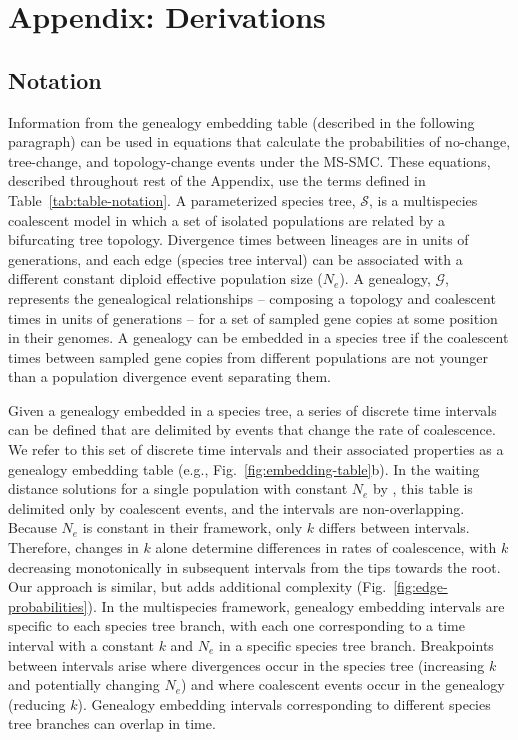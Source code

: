 \documentclass[11pt]{article}
\begin{document}
\section{Appendix: Derivations}

\subsection{Notation}

Information from the genealogy embedding table (described in the following paragraph) can be used 
in equations that 
calculate the 
probabilities of no-change, tree-change, and topology-change events under the 
MS-SMC. These equations, described throughout rest of the Appendix, use the terms defined in 
Table~\ref{tab:table-notation}. 
A parameterized species tree, $\mathcal{S}$, is a multispecies coalescent 
model in which a set of isolated populations are related by a bifurcating
tree topology. Divergence times between lineages are in units of generations, 
and each edge (species tree interval) can be associated with a different constant 
diploid effective population size ($N_e$). 
A genealogy, $\mathcal{G}$, represents the genealogical relationships -- composing
a topology and coalescent times in units of generations -- for a set 
of sampled gene copies at some position in their genomes. A genealogy can be 
embedded in a species tree if the coalescent times between sampled gene copies
from different populations are not younger than a population divergence
event separating them.


Given a genealogy embedded in a species tree, a series of discrete
time intervals can be defined that are delimited 
by events that change the rate of coalescence. 
We refer to this 
set of discrete time intervals and their associated properties
as a genealogy embedding table (e.g., Fig.~\ref{fig:embedding-table}b). 
In the waiting distance solutions for a single population with constant $N_e$ 
by \citet{deng_distribution_2021}, this table is delimited only by coalescent 
events, and the intervals are non-overlapping. 
Because $N_e$ is constant in their framework, only $k$ differs between 
intervals. Therefore, changes in $k$ alone determine differences in rates of coalescence, 
with $k$ decreasing monotonically in subsequent intervals from the tips towards the root. 
Our approach is similar, but adds additional complexity (Fig.~\ref{fig:edge-probabilities}). 
In the multispecies framework, genealogy embedding intervals are specific to each 
species tree branch, with each one corresponding to a time interval with a constant 
$k$ and $N_e$ in a specific species tree branch. 
Breakpoints between intervals arise where divergences 
occur in the species tree (increasing $k$ and potentially changing $N_e$) 
and where coalescent events occur in the genealogy (reducing $k$). 
Genealogy embedding intervals corresponding to different species tree 
branches can overlap in time.
\end{document}
